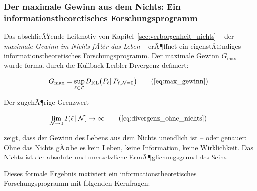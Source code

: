 ﻿\documentclass[12pt,a4paper]{report}
\begin{document}
\subsubsection{Der maximale Gewinn aus dem Nichts: Ein informationstheoretisches Forschungsprogramm}

Das abschlieÃŸende Leitmotiv von Kapitel~\ref{sec:verborgenheit_nichts} -- der \textit{maximale Gewinn im Nichts fÃ¼r das Leben} -- erÃ¶ffnet ein eigenstÃ¤ndiges informationstheoretisches Forschungsprogramm. Der maximale Gewinn $G_{\max}$ wurde formal durch die Kullback-Leibler-Divergenz definiert:

\begin{equation}
	G_{\max} = \sup_{\ell \in \mathcal{L}} D_{\text{KL}}\bigl(P_\ell \| P_{\ell,\mathcal{N}=0}\bigr)
	\tag{\ref{eq:max_gewinn}}
\end{equation}

Der zugehÃ¶rige Grenzwert

\begin{equation}
	\lim_{\mathcal{N} \to 0} I(\ell\,|\,\mathcal{N}) \to \infty
	\tag{\ref{eq:divergenz_ohne_nichts}}
\end{equation}

zeigt, dass der Gewinn des Lebens aus dem Nichts unendlich ist -- oder genauer: Ohne das Nichts gÃ¤be es kein Leben, keine Information, keine Wirklichkeit. Das Nichts ist der absolute und unersetzliche ErmÃ¶glichungsgrund des Seins.

Dieses formale Ergebnis motiviert ein informationstheoretisches Forschungsprogramm mit folgenden Kernfragen:
\end{document}
